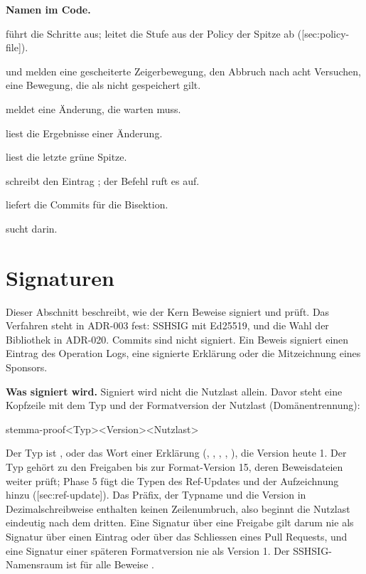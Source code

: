 \startinfobox
{\bf Namen im Code.}
\startitemize[packed]
\item {} führt die Schritte aus;  leitet die Stufe aus
der Policy der Spitze ab ([sec:policy-file]).
\item {} und  melden eine gescheiterte Zeigerbewegung, 
den Abbruch nach acht Versuchen,  eine Bewegung, die als nicht gespeichert gilt.
\item {} meldet eine Änderung, die warten muss.
\item {} liest die Ergebnisse einer Änderung.
\item {} liest die letzte grüne Spitze.
\item {} schreibt den Eintrag ; der Befehl 
ruft es auf.
\item {} liefert die Commits für die Bisektion.
\item {} sucht darin.
\stopitemize
\stopinfobox

\section[sec:signatures]{Signaturen}

Dieser Abschnitt beschreibt, wie der Kern Beweise signiert und prüft.
Das Verfahren steht in ADR-003 fest: SSHSIG mit Ed25519, und die Wahl der Bibliothek in ADR-020.
Commits sind nicht signiert.
Ein Beweis signiert einen Eintrag des Operation Logs, eine signierte Erklärung oder die
Mitzeichnung eines Sponsors.

{\bf Was signiert wird.}
Signiert wird nicht die Nutzlast allein.
Davor steht eine Kopfzeile mit dem Typ und der Formatversion der Nutzlast (Domänentrennung):

\starttyping
stemma-proof\n<Typ>\n<Version>\n<Nutzlast>
\stoptyping

Der Typ ist ,  oder das Wort einer Erklärung
(, , , ,
), die Version heute 1.
Der Typ  gehört zu den Freigaben bis zur Format-Version 15, deren Beweisdateien
 weiter prüft; Phase 5 fügt die Typen des Ref-Updates und der Aufzeichnung hinzu
([sec:ref-update]).
Das Präfix, der Typname und die Version in Dezimalschreibweise enthalten keinen Zeilenumbruch,
also beginnt die Nutzlast eindeutig nach dem dritten.
Eine Signatur über eine Freigabe gilt darum nie als Signatur über einen Eintrag oder über das
Schliessen eines Pull Requests, und eine Signatur einer späteren Formatversion nie als Version 1.
Der SSHSIG-Namensraum ist für alle Beweise .

